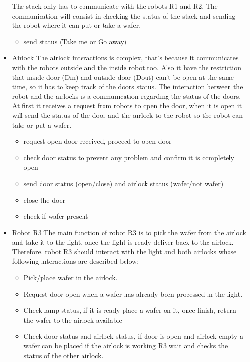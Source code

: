 \documentclass[twocolumn]{article}
\begin{document}
\begin{itemize}
The stack only has to communicate with the robots R1 and R2. The communication will consist in checking the status of the stack and sending the robot where it can put or take a wafer.
\begin{itemize}
\item{ send status (Take me or Go away) }
\end{itemize}
\item Airlock
The airlock interactions is complex, that's because it communicates with the robots outside and the inside robot too. Also it have the restriction that inside door (Din) and outside door (Dout) can't be open at the same time, so it has to keep track of the doors status. 
The interaction between the robot and the airlocks is a communication regarding the status of the doors. At first it receives a request from robots to open the door, when it is open it will send the status of the door and the airlock to the robot so the robot can take or put a wafer.  
\begin{itemize}
\item{ request open door received, proceed to open door}
\item{ check door status to prevent any problem and confirm it is completely open}
\item{ send door status (open/close) and airlock status (wafer/not wafer) }
\item{ close the door}
\item{check if wafer present}

\end{itemize}

\item Robot R3
The main function of robot R3 is to pick the wafer from the airlock and take it to the light, once the light is ready deliver back to the airlock. Therefore, robot R3 should interact with the light and both airlocks whose following interactions are described below:
\begin{itemize}
\item{Pick/place wafer in the airlock. }
\item{Request door open when a wafer has already been processed in the light.}
\item{Check lamp status, if it is ready place a wafer on it, once finish, return the wafer to the airlock available}
\item{ Check door status and airlock status, if door is open and airlock empty a wafer can be placed if the airlock is working R3 wait and checks the status of the other airlock.}
\end{itemize}
\end{itemize}
\end{document}
